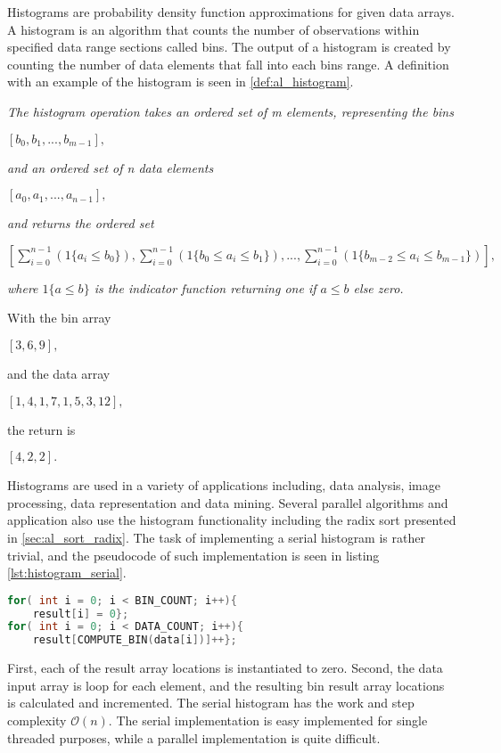 Histograms are probability density function approximations for given data arrays. A histogram is an algorithm that counts the number of observations within specified data range sections called bins. The output of a histogram is created by counting the number of data elements that fall into each bins range. A definition with an example of the histogram is seen in \cref{def:al_histogram}.

\begin{definition}
	\label{def:al_histogram}
	\textit{The histogram operation takes an ordered set of m elements, representing the bins}
	\begin{center}
		$[b_0,b_1,...,b_{m-1}],$
	\end{center}
	\textit{and an ordered set of n data elements}
	\begin{center}
		$[a_0,a_1,...,a_{n-1}],$
	\end{center}
	\textit{and returns the ordered set}
	\begin{center}
		$[\sum_{i=0}^{n-1}(1\{ a_i \leq b_0 \}),\sum_{i=0}^{n-1}(1\{b_0 \leq a_i \leq b_1\}),...,\sum_{i=0}^{n-1}(1\{b_{m-2} \leq a_i \leq b_{m-1}\})],$
	\end{center}
	\textit{where $1\{a\leq b\}$ is the indicator function returning one if $a\leq b$ else zero.}
\end{definition}
\begin{example}
	With the bin array
		\begin{center}
		$[3,6,9],$
	\end{center}
	and the data array 
		\begin{center}
		$[1,4,1,7,1,5,3,12],$
	\end{center}
	the return is
		\begin{center}
		$[4,2,2].$
	\end{center}
\end{example}

Histograms are used in a variety of applications including, data analysis, image processing, data representation and data mining. Several parallel algorithms and application also use the histogram functionality including the radix sort presented in \cref{sec:al_sort_radix}. The task of implementing a serial histogram is rather trivial, and the pseudocode of such implementation is seen in listing \ref{lst:histogram_serial}.

\begin{lstlisting}[language=C,caption={Pseudo code serial implementaion of histogram},label=lst:histogram_serial]
for( int i = 0; i < BIN_COUNT; i++){
	result[i] = 0}; 
for( int i = 0; i < DATA_COUNT; i++){ 
	result[COMPUTE_BIN(data[i])]++}; 
\end{lstlisting}

First, each of the result array locations is instantiated to zero. Second, the data input array is loop for each element, and the resulting bin result array locations is calculated and incremented. The serial histogram has the work and step complexity $\mathcal{O}(n)$. The serial implementation is easy implemented for single threaded purposes, while a parallel implementation is quite difficult. 

           